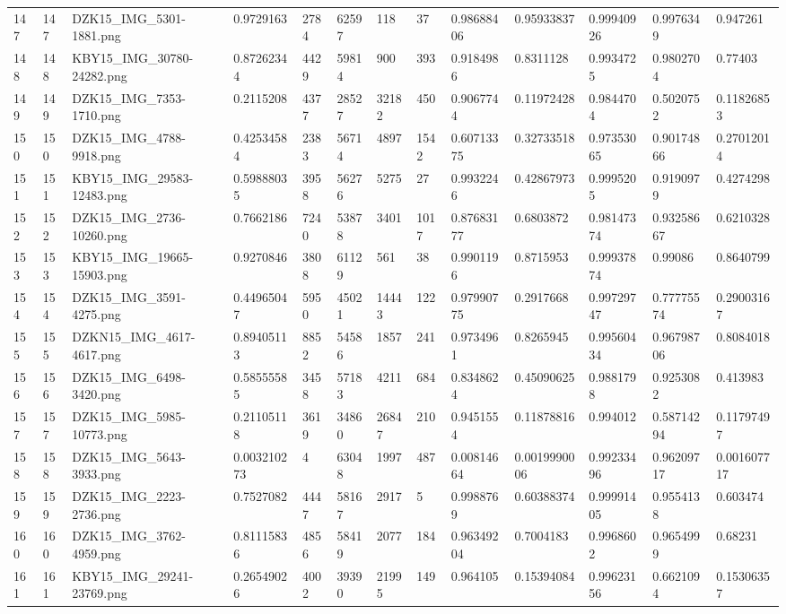 \documentclass[11pt, a4paper, twoside]{report}
\begin{document}
\begin{longtable}[c]{@{}lllllllllllll@{}}
147 & 147 & DZK15\_IMG\_5301-1881.png & 0.9729163 & 2784 & 62597 & 118 & 37 & 0.98688406 & 0.95933837 & 0.99940926 & 0.9976349 & 0.947261 \\
148 & 148 & KBY15\_IMG\_30780-24282.png & 0.87262344 & 4429 & 59814 & 900 & 393 & 0.9184986 & 0.8311128 & 0.9934725 & 0.9802704 & 0.77403 \\
149 & 149 & DZK15\_IMG\_7353-1710.png & 0.2115208 & 4377 & 28527 & 32182 & 450 & 0.9067744 & 0.11972428 & 0.9844704 & 0.5020752 & 0.11826853 \\
150 & 150 & DZK15\_IMG\_4788-9918.png & 0.42534584 & 2383 & 56714 & 4897 & 1542 & 0.60713375 & 0.32733518 & 0.97353065 & 0.90174866 & 0.27012014 \\
151 & 151 & KBY15\_IMG\_29583-12483.png & 0.59888035 & 3958 & 56276 & 5275 & 27 & 0.9932246 & 0.42867973 & 0.9995205 & 0.9190979 & 0.4274298 \\
152 & 152 & DZK15\_IMG\_2736-10260.png & 0.7662186 & 7240 & 53878 & 3401 & 1017 & 0.87683177 & 0.6803872 & 0.98147374 & 0.93258667 & 0.6210328 \\
153 & 153 & KBY15\_IMG\_19665-15903.png & 0.9270846 & 3808 & 61129 & 561 & 38 & 0.9901196 & 0.8715953 & 0.99937874 & 0.99086 & 0.8640799 \\
154 & 154 & DZK15\_IMG\_3591-4275.png & 0.44965047 & 5950 & 45021 & 14443 & 122 & 0.97990775 & 0.2917668 & 0.99729747 & 0.77775574 & 0.29003167 \\
155 & 155 & DZKN15\_IMG\_4617-4617.png & 0.89405113 & 8852 & 54586 & 1857 & 241 & 0.9734961 & 0.8265945 & 0.99560434 & 0.96798706 & 0.8084018 \\
156 & 156 & DZK15\_IMG\_6498-3420.png & 0.58555585 & 3458 & 57183 & 4211 & 684 & 0.8348624 & 0.45090625 & 0.9881798 & 0.9253082 & 0.413983 \\
157 & 157 & DZK15\_IMG\_5985-10773.png & 0.21105118 & 3619 & 34860 & 26847 & 210 & 0.9451554 & 0.11878816 & 0.994012 & 0.58714294 & 0.11797497 \\
158 & 158 & DZK15\_IMG\_5643-3933.png & 0.003210273 & 4 & 63048 & 1997 & 487 & 0.00814664 & 0.0019990006 & 0.99233496 & 0.96209717 & 0.001607717 \\
159 & 159 & DZK15\_IMG\_2223-2736.png & 0.7527082 & 4447 & 58167 & 2917 & 5 & 0.9988769 & 0.60388374 & 0.99991405 & 0.9554138 & 0.603474 \\
160 & 160 & DZK15\_IMG\_3762-4959.png & 0.81115836 & 4856 & 58419 & 2077 & 184 & 0.96349204 & 0.7004183 & 0.9968602 & 0.9654999 & 0.68231 \\
161 & 161 & KBY15\_IMG\_29241-23769.png & 0.26549026 & 4002 & 39390 & 21995 & 149 & 0.964105 & 0.15394084 & 0.99623156 & 0.6621094 & 0.15306357 \\

\end{longtable}
\end{document}
